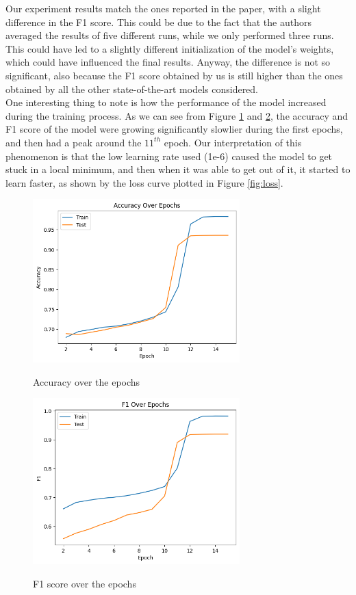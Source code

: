 Our experiment results match the ones reported in the paper, with a slight difference in the F1 score. This could be due to the fact that the authors averaged the results of five different runs, while we only performed three runs. This could have led to a slightly different initialization of the model's weights, which could have influenced the final results. Anyway, the difference is not so significant, also because the F1 score obtained by us is still higher than the ones obtained by all the other state-of-the-art models considered. \\ 
One interesting thing to note is how the performance of the model increased during the training process. As we can see from Figure \ref{fig:accuracy} and \ref{fig:f1}, the accuracy and F1 score of the model were growing significantly slowlier during the first epochs, and then had a peak around the $11^{th}$ epoch. Our interpretation of this phenomenon is that the low learning rate used (1e-6) caused the model to get stuck in a local minimum, and then when it was able to get out of it, it started to learn faster, as shown by the loss curve plotted in Figure \ref{fig:loss}.

\begin{figure}[!ht]
    \centering
    \caption{Accuracy over the epochs}
    \includegraphics[width=8cm]{images/Accuracy.png}
    \label{fig:accuracy}
\end{figure}

\begin{figure}[!ht]
    \centering
    \caption{F1 score over the epochs}
    \includegraphics[width=8cm]{images/F1.png}
    \label{fig:f1}
\end{figure}

